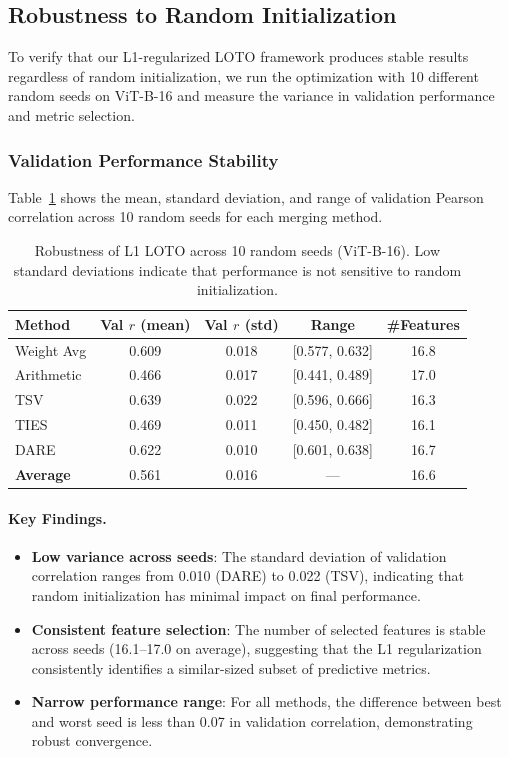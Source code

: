 \subsection{Robustness to Random Initialization}
\label{sec:robustness}

To verify that our L1-regularized LOTO framework produces stable results regardless of random initialization, we run the optimization with 10 different random seeds on ViT-B-16 and measure the variance in validation performance and metric selection.

\subsubsection{Validation Performance Stability}

Table~\ref{tab:seed_robustness} shows the mean, standard deviation, and range of validation Pearson correlation across 10 random seeds for each merging method.

\begin{table}[h]
\centering
\caption{Robustness of L1 LOTO across 10 random seeds (ViT-B-16). Low standard deviations indicate that performance is not sensitive to random initialization.}
\label{tab:seed_robustness}
\begin{tabular}{@{}lcccc@{}}
\toprule
\textbf{Method} & \textbf{Val $r$ (mean)} & \textbf{Val $r$ (std)} & \textbf{Range} & \textbf{\#Features} \\
\midrule
Weight Avg & 0.609 & 0.018 & [0.577, 0.632] & 16.8 \\
Arithmetic & 0.466 & 0.017 & [0.441, 0.489] & 17.0 \\
TSV & 0.639 & 0.022 & [0.596, 0.666] & 16.3 \\
TIES & 0.469 & 0.011 & [0.450, 0.482] & 16.1 \\
DARE & 0.622 & 0.010 & [0.601, 0.638] & 16.7 \\
\midrule
\textbf{Average} & 0.561 & 0.016 & --- & 16.6 \\
\bottomrule
\end{tabular}
\end{table}

\paragraph{Key Findings.}
\begin{itemize}
    \item \textbf{Low variance across seeds}: The standard deviation of validation correlation ranges from 0.010 (DARE) to 0.022 (TSV), indicating that random initialization has minimal impact on final performance.
    \item \textbf{Consistent feature selection}: The number of selected features is stable across seeds (16.1--17.0 on average), suggesting that the L1 regularization consistently identifies a similar-sized subset of predictive metrics.
    \item \textbf{Narrow performance range}: For all methods, the difference between best and worst seed is less than 0.07 in validation correlation, demonstrating robust convergence.
\end{itemize}

